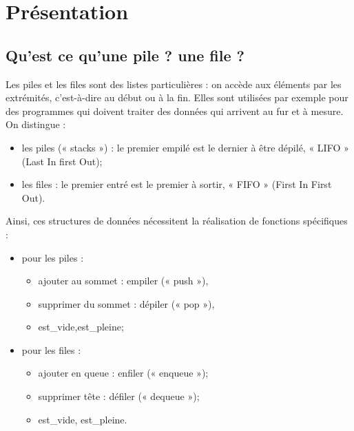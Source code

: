 \documentclass[10pt,fleqn]{article} %
\begin{document}


\section{Présentation}
\subsection{Qu'est ce qu'une pile ? une file ?}
Les piles et les files sont des listes particulières : on accède aux éléments par les extrémités, c'est-à-dire au début ou à la fin.
Elles sont utilisées par exemple pour des programmes qui doivent traiter des données qui arrivent au fur et à mesure.
On distingue :
\begin{itemize}[label=,font=\color{ocre}] 
\item les piles (« stacks ») : le premier empilé est le dernier à être dépilé, « LIFO » (Last In first Out);
\item les files : le premier entré est le premier à sortir, « FIFO » (First In First Out).
\end{itemize}\vspace{.25cm}
\noindent\begin{minipage}[c]{.53\linewidth}
\indent Ainsi, ces structures de données nécessitent la réalisation de fonctions spécifiques :
\begin{itemize}[label=,font=\color{ocre}] 
\item pour les piles :
\begin{itemize}[label=,font=\color{ocre}] 
\item ajouter au sommet : empiler (« push »),
\item supprimer du sommet : dépiler (« pop »),
\item est\_vide,est\_pleine;
\end{itemize} 
\item pour les files :
\begin{itemize}[label=,font=\color{ocre}] 
\item ajouter en queue : enfiler (« enqueue »);
\item supprimer tête : défiler (« dequeue »);
\item est\_vide, est\_pleine.
\end{itemize}
\end{itemize}
\end{minipage} \hfill
\end{document}
